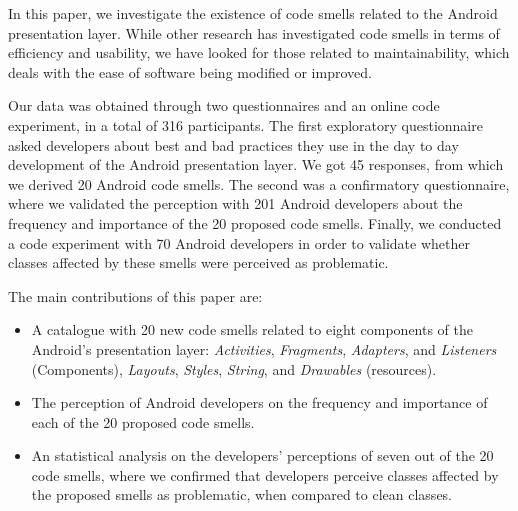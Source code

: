 In this paper, we investigate the existence of code smells related to the Android presentation layer. While other research has investigated code smells in terms of efficiency and usability, we have looked for those related to maintainability, which deals with the ease of software being modified or improved. 

Our data was obtained through two questionnaires and an online code experiment, in a total of 316 participants. The first exploratory questionnaire asked developers about best and bad practices they use in the day to day development of the Android presentation layer. We got 45 responses, from which we derived 20 Android code smells. The second was a confirmatory questionnaire, where we validated the perception with 201 Android developers about the frequency and importance of the 20 proposed code smells. Finally, we conducted a code experiment with 70 Android developers in order to validate whether classes affected by these smells were perceived as problematic.


The main contributions of this paper are:

\begin{itemize}
  \item A catalogue with 20 new code smells related to eight components of the Android's presentation layer: \textit{Activities}, \textit{Fragments}, \textit{Adapters}, and \textit{Listeners} (Components), \textit{Layouts}, \textit{Styles}, \textit{String}, and \textit{Drawables} (resources).
  
  \item The perception of Android developers on the frequency and importance of each of the 20 proposed code smells.

  \item An statistical analysis on the developers' perceptions of seven out of the 20 code smells, where we confirmed that developers perceive classes affected by the proposed smells as problematic, when compared to clean classes.
\end{itemize}


